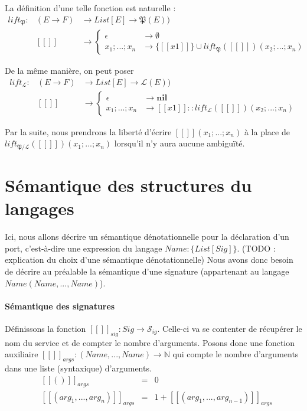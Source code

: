 \documentclass[11pt,a4paper,fleqn]{report}
\newcommand{\Sig}{\mathcal{S}_{ig}}
\begin{document}
La définition d'une telle fonction est naturelle : 
\[\begin{array}{lll}
lift_\mathfrak{P} :&(E\rightarrow F) &\rightarrow List[E] \rightarrow \mathfrak{P}(E))\\
&[\![]\!] &\rightarrow \begin{cases}
\epsilon &\rightarrow \emptyset \\
x_1; ... ; x_n &\rightarrow \{[\![x1]\!]\}\cup lift_\mathfrak{P}([\![]\!])(x_2;...;x_n)
\end{cases}
\end{array}
\]

De la même manière, on peut poser
\[\begin{array}{lll}
lift_\mathcal{L} :&(E\rightarrow F) &\rightarrow List[E] \rightarrow \mathcal{L}(E))\\
&[\![]\!] &\rightarrow \begin{cases}
\epsilon &\rightarrow \mathbf{nil} \\
x_1; ... ; x_n &\rightarrow [\![x1]\!] :: lift_\mathcal{L}([\![]\!])(x_2;...;x_n)
\end{cases}
\end{array}
\]
\vspace{0.5cm}

Par la suite, nous prendrons la liberté d'écrire $[\![]\!](x_1;...;x_n)$ à la place de \newline $lift_{\mathfrak{P}/\mathcal{L}}([\![]\!])(x_1; ... ; x_n)$ lorsqu'il n'y aura aucune ambiguïté.


\section{Sémantique des structures du langages}
Ici, nous allons décrire un sémantique dénotationnelle pour la déclaration d'un port, c'est-à-dire une expression du langage $Name : \{List[Sig]\}$. (TODO : explication du choix d'une sémantique dénotationnelle) Nous avons donc besoin de décrire au préalable la sémantique d'une signature (appartenant au langage $Name(Name,...,Name)$).

\paragraph{Sémantique des signatures}
Définissons la fonction $[\![]\!]_{sig} :  Sig \rightarrow \Sig $. Celle-ci va se contenter de récupérer le nom du service et de compter le nombre d'arguments. Posons donc une fonction auxiliaire $[\![]\!]_{args} : (Name, ... , Name) \rightarrow \mathbb{N}$ qui compte le nombre d'arguments dans une liste (syntaxique) d'arguments.
\[\begin{array}{llll}
&[\![()]\!]_{args} &=& 0\\
&[\![(arg_1,...,arg_n)]\!]_{args} &=& 1 + [\![(arg_1,...,arg_{n-1})]\!]_{args} 
\end{array}\]
\end{document}
